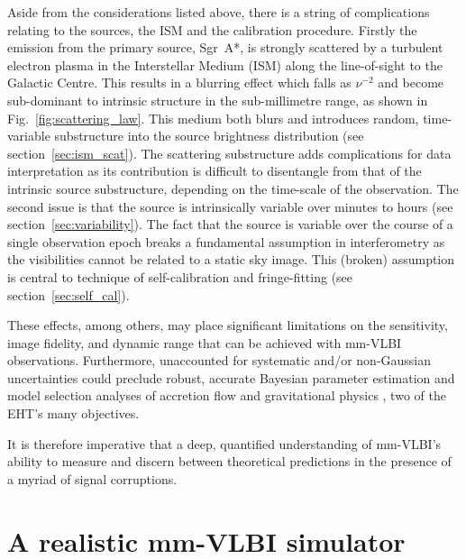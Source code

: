 Aside from the considerations listed above, there is a string of complications relating to the sources, the ISM and the calibration procedure. 
Firstly the emission from the primary source, Sgr~A*, is strongly scattered by a turbulent electron plasma in the Interstellar Medium (ISM) along the line-of-sight to the Galactic Centre. This results in a blurring effect \citep[e.g.][]{Fish_2014} which falls as $\nu^{-2}$ and become sub-dominant to intrinsic structure in the sub-millimetre range, as shown in Fig.~\ref{fig:scattering_law}. This medium both blurs and introduces random, time-variable substructure into the source brightness distribution (see section~\ref{sec:ism_scat}). The scattering substructure adds complications for data interpretation as its contribution is difficult to disentangle from that of the intrinsic source substructure, depending on the time-scale of the observation.
The second issue is that the source is intrinsically variable over minutes to hours (see section~\ref{sec:variability}). The fact that the source is variable over the course of a single observation epoch breaks a fundamental assumption in interferometry as the visibilities cannot be related to a static sky image. This (broken) assumption is central to technique of self-calibration and fringe-fitting (see section~\ref{sec:self_cal}).


These effects, among others, may place significant limitations on the sensitivity, image fidelity, and dynamic range that can be achieved with mm-VLBI observations.  Furthermore, unaccounted for systematic and/or non-Gaussian uncertainties could preclude robust, accurate Bayesian parameter estimation and model selection analyses of accretion flow \citep[e.g.][]{Broderick_2016} and gravitational physics \citep[e.g.][]{Broderick_2014, Psaltis_2016}, two of the EHT's many objectives. 

It is therefore imperative that a deep, quantified understanding of mm-VLBI's ability to measure and discern between theoretical predictions in the presence of a myriad of signal corruptions.

 \citep{Blecher_2016}
\section{A realistic mm-VLBI simulator}

